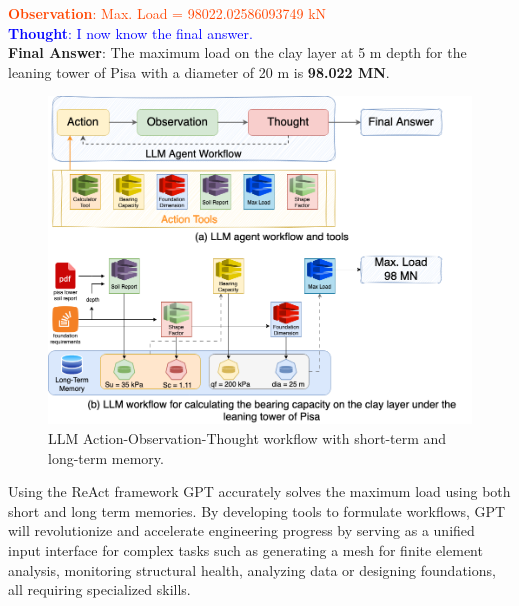 \documentclass{article}
\begin{document}
\noindent\textcolor{OrangeRed}{\textbf{Observation}: Max. Load = 98022.02586093749 kN}\\

\noindent \textcolor{blue}{\textbf{Thought}: I now know the final answer.}\\

\noindent \textcolor{BrickRed}{\textbf{Final Answer}: The maximum load on the clay layer at 5 m depth for the leaning tower of Pisa with a diameter of 20 m is \textbf{98.022 MN}.\\}

\begin{figure}[!htbp]
    \centering
    \includegraphics[width=\textwidth]{figs/llm-agent-workflow.png}
    \caption{LLM Action-Observation-Thought workflow with short-term and long-term memory.}
    \label{fig:llm-workflow}
\end{figure}


\noindent Using the ReAct framework GPT accurately solves the maximum load using both short and long term memories. By developing tools to formulate workflows, GPT will revolutionize and accelerate engineering progress by serving as a unified input interface for complex tasks such as generating a mesh for finite element analysis, monitoring structural health, analyzing data or designing foundations, all requiring specialized skills. 
\end{document}
